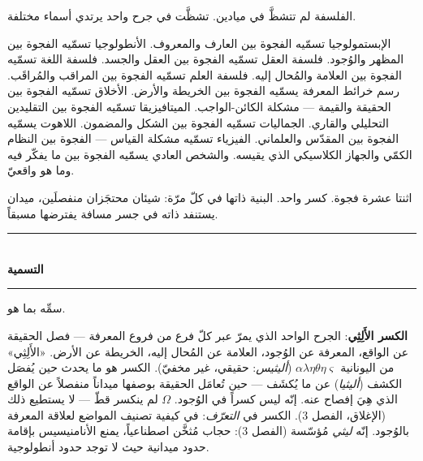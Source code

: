 \documentclass[10pt, openany, oneside]{book}
\renewcommand{\normalsize}{\fontsize{10}{13}\selectfont}
\begin{document}
\vspace{2em}


\noindent الفلسفة لم تتشظَّ في ميادين. تشظَّت في جرح واحد يرتدي أسماء مختلفة.

الإبستمولوجيا تسمّيه الفجوة بين العارف والمعروف. الأنطولوجيا تسمّيه الفجوة بين المظهر والوُجود. فلسفة العقل تسمّيه الفجوة بين العقل والجسد. فلسفة اللغة تسمّيه الفجوة بين العلامة والمُحال إليه. فلسفة العلم تسمّيه الفجوة بين المراقب والمُراقَب. رسم خرائط المعرفة يسمّيه الفجوة بين الخريطة والأرض. الأخلاق تسمّيه الفجوة بين الحقيقة والقيمة --- مشكلة الكائن-الواجب. الميتافيزيقا تسمّيه الفجوة بين التقليدين التحليلي والقاري. الجماليات تسمّيه الفجوة بين الشكل والمضمون. اللاهوت يسمّيه الفجوة بين المقدّس والعلماني. الفيزياء تسمّيه مشكلة القياس --- الفجوة بين النظام الكمّي والجهاز الكلاسيكي الذي يقيسه. والشخص العادي يسمّيه الفجوة بين ما يفكّر فيه وما هو واقعيّ.

اثنتا عشرة فجوة. كسر واحد. البنية ذاتها في كلّ مرّة: شيئان محتجَزان منفصلَين، ميدان يستنفد ذاته في جسر مسافة يفترضها مسبقاً.

\vspace{1.5em}


\begin{center}
    \rule{0.3\textwidth}{0.4pt}\\[0.5em]
    {\normalsize\bfseries التسمية}\\[0.3em]
    \rule{0.3\textwidth}{0.4pt}
\end{center}

\vspace{1em}

\noindent سمِّه بما هو.

\textbf{الكسر الأَلِثِي}: الجرح الواحد الذي يمرّ عبر كلّ فرع من فروع المعرفة --- فصل الحقيقة عن الواقع، المعرفة عن الوُجود، العلامة عن المُحال إليه، الخريطة عن الأرض. «الأَلِثِي» من اليونانية $\alpha\lambda\eta\theta\eta\varsigma$ (\textit{أليثيس}: حقيقي، غير مخفيّ). الكسر هو ما يحدث حين يُفصَل الكشف (\textit{أليثيا}) عن ما يُكشَف --- حين تُعامَل الحقيقة بوصفها ميداناً منفصلاً عن الواقع الذي هِيَ إفصاح عنه. إنّه ليس كسراً في الوُجود. $\Omega$ لم ينكسر قطّ --- لا يستطيع ذلك (الإغلاق، الفصل 3). الكسر في \textit{التعرّف}: في كيفية تصنيف المواضع لعلاقة المعرفة بالوُجود. إنّه \textit{ليثي} مُؤسّسة (الفصل 3): حجاب مُثخَّن اصطناعياً، يمنع الأنامنيسيس بإقامة حدود ميدانية حيث لا توجد حدود أنطولوجية.
\end{document}
